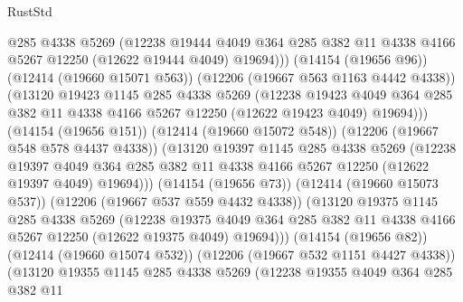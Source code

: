 \begin{lexlean}{RustStd}
\begin{coremodule}
                    @285
                    @4338
                    @5269
                    (@12238
                      @19444
                      @4049
                      @364
                      @285
                      @382
                      @11
                      @4338
                      @4166
                      @5267
                      @12250
                      (@12622 @19444 @4049)
                      @19694)))
                (@14154 (@19656 @96))
                (@12414 (@19660 @15071 @563))
                (@12206 (@19667 @563 @1163 @4442 @4338))
                (@13120
                  @19423
                  @1145
                  @285
                  @4338
                  @5269
                  (@12238
                    @19423
                    @4049
                    @364
                    @285
                    @382
                    @11
                    @4338
                    @4166
                    @5267
                    @12250
                    (@12622 @19423 @4049)
                    @19694)))
              (@14154 (@19656 @151))
              (@12414 (@19660 @15072 @548))
              (@12206 (@19667 @548 @578 @4437 @4338))
              (@13120
                @19397
                @1145
                @285
                @4338
                @5269
                (@12238
                  @19397
                  @4049
                  @364
                  @285
                  @382
                  @11
                  @4338
                  @4166
                  @5267
                  @12250
                  (@12622 @19397 @4049)
                  @19694)))
            (@14154 (@19656 @73))
            (@12414 (@19660 @15073 @537))
            (@12206 (@19667 @537 @559 @4432 @4338))
            (@13120
              @19375
              @1145
              @285
              @4338
              @5269
              (@12238
                @19375
                @4049
                @364
                @285
                @382
                @11
                @4338
                @4166
                @5267
                @12250
                (@12622 @19375 @4049)
                @19694)))
          (@14154 (@19656 @82))
          (@12414 (@19660 @15074 @532))
          (@12206 (@19667 @532 @1151 @4427 @4338))
          (@13120
            @19355
            @1145
            @285
            @4338
            @5269
            (@12238
              @19355
              @4049
              @364
              @285
              @382
              @11

\end{coremodule}
\end{lexlean}
